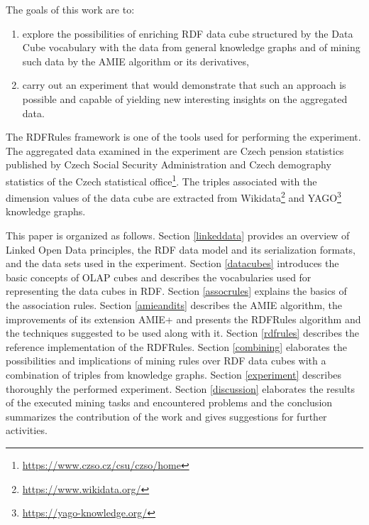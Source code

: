The goals of this work are to:

\begin{enumerate}
    \item explore the possibilities of enriching RDF data cube structured by the Data Cube vocabulary with the data from general knowledge graphs and of mining such data by the AMIE algorithm or its derivatives,
    \item carry out an experiment that would demonstrate that such an approach is possible and capable of yielding new interesting insights on the aggregated data. 
\end{enumerate}

The RDFRules framework is one of the tools used for performing the experiment. The aggregated data examined in the experiment are Czech pension statistics published by Czech Social Security Administration and Czech demography statistics of the Czech statistical office\footnote{\href{https://www.czso.cz/csu/czso/home}{https://www.czso.cz/csu/czso/home}}. The triples associated with the dimension values of the data cube are extracted from Wikidata\footnote{\href{https://www.wikidata.org/}{https://www.wikidata.org/}} and YAGO\footnote{\href{https://yago-knowledge.org/}{https://yago-knowledge.org/}} knowledge graphs.

This paper is organized as follows. Section \ref{linkeddata} provides an overview of Linked Open Data principles, the RDF data model and its serialization formats, and the data sets used in the experiment. Section \ref{datacubes} introduces the basic concepts of OLAP cubes and describes the vocabularies used for representing the data cubes in RDF. Section \ref{assocrules} explains the basics of the association rules. Section \ref{amieandits} describes the AMIE algorithm, the improvements of its extension AMIE+ and presents the RDFRules algorithm and the techniques suggested to be used along with it. Section \ref{rdfrules} describes the reference implementation of the RDFRules. Section \ref{combining} elaborates the possibilities and implications of mining rules over RDF data cubes with a combination of triples from knowledge graphs. Section \ref{experiment} describes thoroughly the performed experiment. Section \ref{discussion} elaborates the results of the executed mining tasks and encountered problems and the conclusion summarizes the contribution of the work and gives suggestions for further activities.


